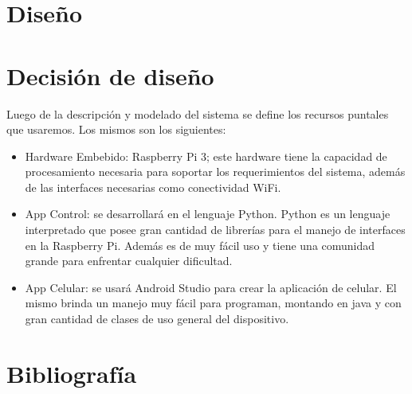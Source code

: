 \documentclass[16pt, article,notitlepage]{article}
\begin{document}
\section{Diseño}


\section{Decisión de diseño}
Luego de la descripción y modelado del sistema se define los recursos puntales que usaremos. Los mismos son los siguientes:

\begin{itemize}
	\item   Hardware Embebido: Raspberry Pi 3; este hardware tiene la capacidad de procesamiento necesaria para soportar los requerimientos del sistema, además de las interfaces necesarias como conectividad WiFi.
	\item App Control: se desarrollará en el lenguaje Python. Python es un lenguaje interpretado que posee gran cantidad de librerías para el manejo de interfaces en la Raspberry Pi. Además es de muy fácil uso y tiene una comunidad grande para enfrentar cualquier dificultad.
	\item   App Celular: se usará Android Studio para crear la aplicación de celular. El mismo brinda un manejo muy fácil para programan, montando en java y con gran cantidad de clases de uso general del dispositivo.
	
\end{itemize}

\section{Bibliografía}



\end{document}
